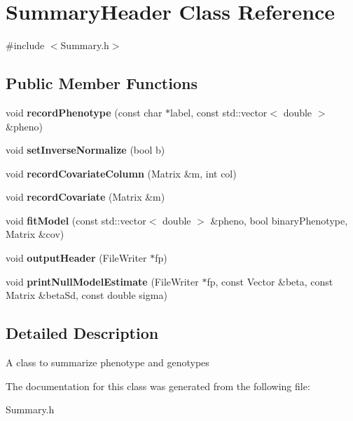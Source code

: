 \hypertarget{classSummaryHeader}{\section{Summary\-Header Class Reference}
\label{classSummaryHeader}
}


{\ttfamily \#include $<$Summary.\-h$>$}

\subsection*{Public Member Functions}
\begin{DoxyCompactItemize}
\item 
\hypertarget{classSummaryHeader_a57c66924a410e9795ca6cf10958bb289}{void {\bfseries record\-Phenotype} (const char $\ast$label, const std\-::vector$<$ double $>$ \&pheno)}\label{classSummaryHeader_a57c66924a410e9795ca6cf10958bb289}

\item 
\hypertarget{classSummaryHeader_a22a58cc4a69af535073ea29bf8296eb0}{void {\bfseries set\-Inverse\-Normalize} (bool b)}\label{classSummaryHeader_a22a58cc4a69af535073ea29bf8296eb0}

\item 
\hypertarget{classSummaryHeader_a60a5f6ff66092b8379dad2837f3bf7f1}{void {\bfseries record\-Covariate\-Column} (Matrix \&m, int col)}\label{classSummaryHeader_a60a5f6ff66092b8379dad2837f3bf7f1}

\item 
\hypertarget{classSummaryHeader_a18e781a07579955e0e7eea1b103280be}{void {\bfseries record\-Covariate} (Matrix \&m)}\label{classSummaryHeader_a18e781a07579955e0e7eea1b103280be}

\item 
\hypertarget{classSummaryHeader_a7f82d2263d52c75c5e808dc9bb317ed2}{void {\bfseries fit\-Model} (const std\-::vector$<$ double $>$ \&pheno, bool binary\-Phenotype, Matrix \&cov)}\label{classSummaryHeader_a7f82d2263d52c75c5e808dc9bb317ed2}

\item 
\hypertarget{classSummaryHeader_a3f6a9365fd0e30bb076ae61dc45dfeaf}{void {\bfseries output\-Header} (File\-Writer $\ast$fp)}\label{classSummaryHeader_a3f6a9365fd0e30bb076ae61dc45dfeaf}

\item 
\hypertarget{classSummaryHeader_a837a8fe3ca1ea37df06c35261ac19bcf}{void {\bfseries print\-Null\-Model\-Estimate} (File\-Writer $\ast$fp, const Vector \&beta, const Matrix \&beta\-Sd, const double sigma)}\label{classSummaryHeader_a837a8fe3ca1ea37df06c35261ac19bcf}

\end{DoxyCompactItemize}


\subsection{Detailed Description}
A class to summarize phenotype and genotypes 

The documentation for this class was generated from the following file\-:\begin{DoxyCompactItemize}
\item 
Summary.\-h\end{DoxyCompactItemize}
